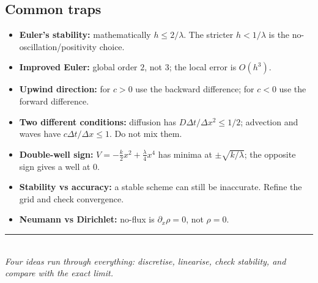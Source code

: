\documentclass[10.5pt,a4paper]{article}
\begin{document}
\subsection*{Common traps}

\begin{warnbox}
\begin{itemize}
\item \textbf{Euler's stability:} mathematically \(h\le2/\lambda\).
The stricter \(h<1/\lambda\) is the no-oscillation/positivity choice.
\item \textbf{Improved Euler:} global order \(2\), not \(3\); the local
error is \(O(h^3)\).
\item \textbf{Upwind direction:} for \(c>0\) use the backward difference;
for \(c<0\) use the forward difference.
\item \textbf{Two different conditions:} diffusion has
\(D\Delta t/\Delta x^2\le1/2\); advection and waves have
\(c\Delta t/\Delta x\le1\). Do not mix them.
\item \textbf{Double-well sign:} \(V=-\frac{k}{2}x^2+\frac{\lambda}{4}x^4\)
has minima at \(\pm\sqrt{k/\lambda}\); the opposite sign gives a well at \(0\).
\item \textbf{Stability vs accuracy:} a stable scheme can still be
inaccurate. Refine the grid and check convergence.
\item \textbf{Neumann vs Dirichlet:} no-flux is \(\partial_x\rho=0\),
not \(\rho=0\).
\end{itemize}
\end{warnbox}

\vspace{0.4em}
\begin{center}
{\color{accent}\rule{0.5\linewidth}{0.6pt}}\\[0.3em]
{\small\itshape Four ideas run through everything: discretise,
linearise, check stability, and compare with the exact limit.}
\end{center}
\end{document}
